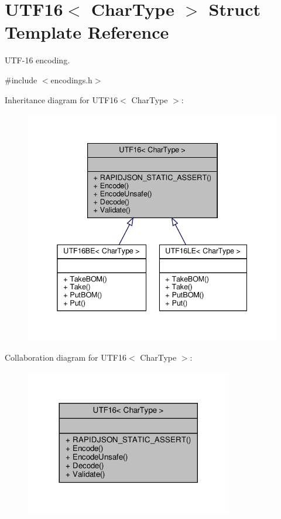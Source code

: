 \hypertarget{structUTF16}{}\section{U\+T\+F16$<$ Char\+Type $>$ Struct Template Reference}
\label{structUTF16}


U\+T\+F-\/16 encoding.  




{\ttfamily \#include $<$encodings.\+h$>$}



Inheritance diagram for U\+T\+F16$<$ Char\+Type $>$\+:
\nopagebreak
\begin{figure}[H]
\begin{center}
\leavevmode
\includegraphics[width=338pt]{structUTF16__inherit__graph}
\end{center}
\end{figure}


Collaboration diagram for U\+T\+F16$<$ Char\+Type $>$\+:
\nopagebreak
\begin{figure}[H]
\begin{center}
\leavevmode
\includegraphics[width=257pt]{structUTF16__coll__graph}
\end{center}
\end{figure}
